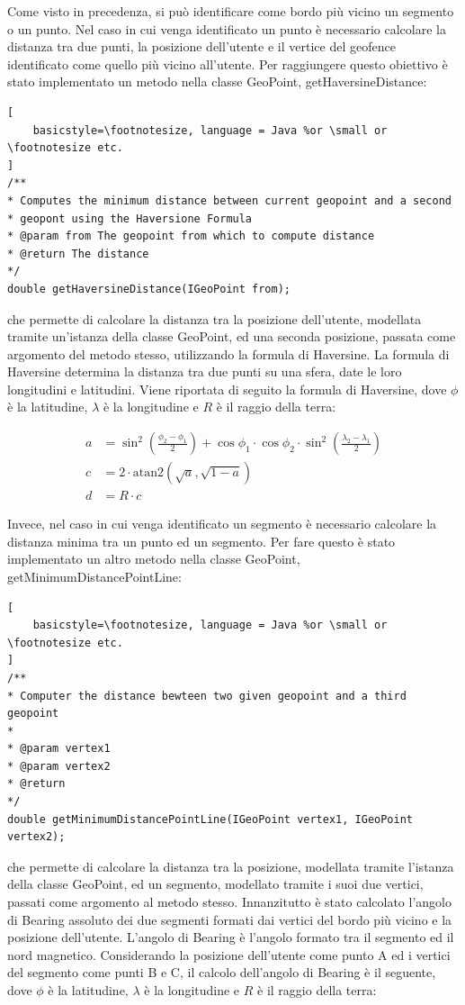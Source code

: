 Come visto in precedenza, si può identificare come bordo più vicino un segmento o un punto. Nel caso in cui venga identificato un punto è necessario calcolare la distanza tra due punti, la posizione dell'utente e il vertice del geofence identificato come quello più vicino all'utente. Per raggiungere questo obiettivo è stato implementato un metodo nella classe GeoPoint, getHaversineDistance:
\begin{lstlisting}[
    basicstyle=\footnotesize, language = Java %or \small or \footnotesize etc.
]
/**
* Computes the minimum distance between current geopoint and a second 
* geopont using the Haversione Formula
* @param from The geopoint from which to compute distance
* @return The distance
*/
double getHaversineDistance(IGeoPoint from);
\end{lstlisting}

che permette di calcolare la distanza tra la posizione dell'utente, modellata tramite un'istanza della classe GeoPoint, ed una seconda posizione, passata come argomento del metodo stesso, utilizzando la formula di Haversine. La formula di Haversine determina la distanza tra due punti su una sfera, date le loro longitudini e latitudini.
Viene riportata di seguito la formula di Haversine, dove $\phi$ è la latitudine, $\lambda$ è la longitudine e $R$ è il raggio della terra:

\begin{align*}
a & = \sin^2\left(\frac{\phi_2 - \phi_1}{2}\right) + \cos\phi_1 \cdot \cos\phi_2 \cdot \sin^2\left(\frac{\lambda_2 - \lambda_1}{2}\right) \\
c & = 2 \cdot \mathrm{atan2}\left(\sqrt{a}, \sqrt{1-a}\right) \\
d & = R \cdot c
\end{align*}

Invece, nel caso in cui venga identificato un segmento è necessario calcolare la distanza minima tra un punto ed un segmento. Per fare questo è stato implementato un altro metodo nella classe GeoPoint, getMinimumDistancePointLine:

\begin{lstlisting}[
    basicstyle=\footnotesize, language = Java %or \small or \footnotesize etc.
]
/**
* Computer the distance bewteen two given geopoint and a third geopoint
*
* @param vertex1
* @param vertex2
* @return
*/
double getMinimumDistancePointLine(IGeoPoint vertex1, IGeoPoint vertex2);
\end{lstlisting}

che permette di calcolare la distanza tra la posizione, modellata tramite l'istanza della classe GeoPoint, ed un segmento, modellato tramite i suoi due vertici, passati come argomento al metodo stesso.
Innanzitutto è stato calcolato l'angolo di Bearing assoluto dei due segmenti formati dai vertici del bordo più vicino e la posizione dell'utente. L'angolo di Bearing è l'angolo formato tra il segmento ed il nord magnetico.
Considerando la posizione dell'utente come punto A ed i vertici del segmento come punti B e C, il calcolo dell'angolo di Bearing è il seguente, dove $\phi$ è la latitudine, $\lambda$ è la longitudine e $R$ è il raggio della terra:

